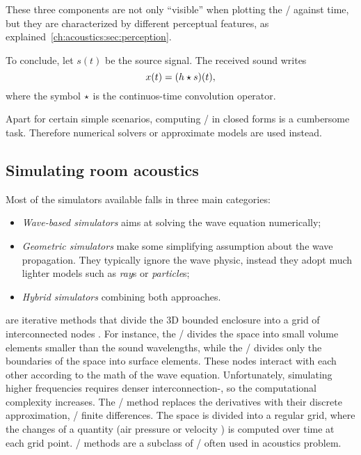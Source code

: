 \mynewline
These three components are not only ``visible'' when plotting the \RIR/ against time,
but they are characterized by different perceptual features, as explained~\cref{ch:acoustics:sec:perception}.

\mynewline
To conclude, let $s(t)$ be the source signal. The received sound writes
\begin{equation}
    x(t) = (h \star s)(t)
    ,
\end{equation}
where the symbol $\star$ is the continuos-time convolution operator.

Apart for certain simple scenarios, computing \RIRs/ in closed forms is a cumbersome task.
Therefore numerical solvers or approximate models are used instead.

\subsection{Simulating room acoustics}\label{sec:acoustics:simulators}
Most of the simulators available falls in three main categories:
\begin{itemize}
    \item \textit{Wave-based simulators} aims at solving the wave equation numerically;
    \item \textit{Geometric simulators} make some simplifying assumption about the wave propagation.
    They typically ignore the wave physic, instead they adopt much lighter models such as \textit{ray}s or \textit{particle}s;
    \item \textit{Hybrid simulators} combining both approaches.
\end{itemize}

 are iterative methods that divide the 3D bounded enclosure into a grid of interconnected nodes
.
For instance, the \FEM/ divides the space into small volume elements smaller than the sound wavelengths,
while the \BEM/ divides only the boundaries of the space into surface elements.
These nodes interact with each other according to the math of the wave equation.
Unfortunately, simulating higher frequencies requires denser interconnection-, so the computational complexity increases.
The \FDTDf/ method replaces the derivatives with their discrete approximation, \ie/ finite differences.
The space is divided into a regular grid, where the changes of a quantity (air pressure or velocity ) is computed over time at each grid point.
\DWMf/ methods are a subclass of \FDTD/ often used in acoustics problem.


